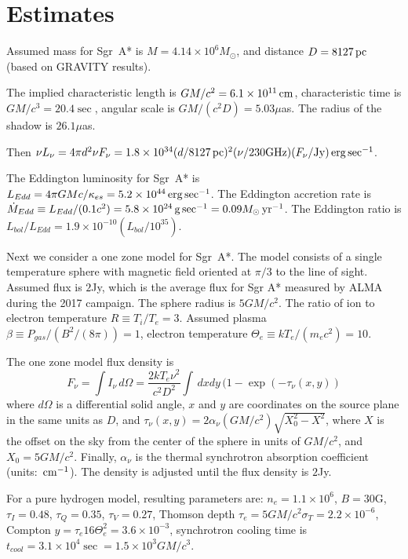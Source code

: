 \documentclass[twocolumn,tighten,dvipsnames]{aastex63}
\newcommand\sgra{Sgr~A*\xspace}
\newcommand\msun{{M_\odot}}
\newcommand\yr{{\rm \, yr}}
\newcommand\erg{{\rm \, erg}}
\newcommand\cm{{\rm \, cm}}
\newcommand\pc{{\rm \, pc}}
\newcommand\gm{{\rm \, g}}
\newcommand\<{{\langle}}
\renewcommand\>{{\rangle}} %
\begin{document}
\section{Estimates}

Assumed mass for \sgra is $M = 4.14 \times 10^6 \msun$, and distance $D = 8127\pc$ (based on GRAVITY results).

The implied characteristic length is $G M/c^2 = 6.1 \times 10^{11} \cm$, characteristic time is $G M/c^3 = 20.4\sec$, angular scale is $G M/(c^2 D) = 5.03\mu$as.  The radius of the shadow is $26.1\mu$as.

Then $\nu L_\nu = 4 \pi d^2 \nu F_\nu = 1.8 \times 10^{34} (d/8127 \pc)^2 (\nu/230 {\rm GHz})(F_\nu/{\rm Jy}) \erg \sec^{-1}$.

The Eddington luminosity for \sgra is $L_{Edd} = 4\pi G M c/\kappa_{es} = 5.2 \times 10^{44} \erg\sec^{-1}$. The Eddington accretion rate is $\dot{M}_{Edd} \equiv  L_{Edd}/(0.1 c^2) = 5.8 \times 10^{24} \gm \sec^{-1} = 0.09 \msun \yr^{-1}$.  The Eddington ratio is $L_{bol}/L_{Edd} = 1.9 \times 10^{-10} (L_{bol}/10^{35})$.

Next we consider a one zone model for \sgra.  The model consists of a single temperature sphere with magnetic field oriented at $\pi/3$ to the line of sight.  Assumed flux is $2$Jy, which is the average flux for Sgr A* measured by ALMA during the 2017 campaign.  The sphere radius is $5 G M/c^2$.  The ratio of ion to electron temperature $R \equiv T_i/T_e = 3$.  Assumed plasma $\beta \equiv  P_{gas}/(B^2/(8\pi)) = 1$, electron temperature $\Theta_e \equiv k T_e/(m_e c^2) = 10$.

The one zone model flux density is
\begin{equation}
    F_\nu = \int I_\nu \, d\Omega = \frac{2 k T_e \nu^2}{c^2 D^2} \int \, dx dy\,  (1 - \exp(-\tau_\nu(x,y))
\end{equation}
where $d\Omega$ is a differential solid angle, $x$ and $y$ are coordinates on the source plane in the same units as $D$, and $\tau_\nu(x,y) = 2 \alpha_\nu (G M/c^2) \sqrt{X_0^2 - X^2}$, where $X$ is the offset on the sky from the center of the sphere in units of $GM/c^2$, and $X_0 = 5 G M/c^2$.  Finally, $\alpha_\nu$ is the thermal synchrotron absorption coefficient (units: $\cm^{-1}$).  The density is adjusted until the flux density is $2$Jy.

For a pure hydrogen model, resulting parameters are: $n_e = 1.1 \times 10^6$, $B = 30$G, $\tau_I = 0.48$, $\tau_Q = 0.35 $, $\tau_V = 0.27$, Thomson depth $\tau_e = 5 G M/c^2 \sigma_T = 2.2 \times 10^{-6}$, Compton $y = \tau_e 16 \Theta_e^2 = 3.6 \times 10^{-3}$, synchrotron cooling time is $t_{cool} = 3.1 \times 10^4\sec = 1.5 \times 10^3 G M/c^3$.
\end{document}
